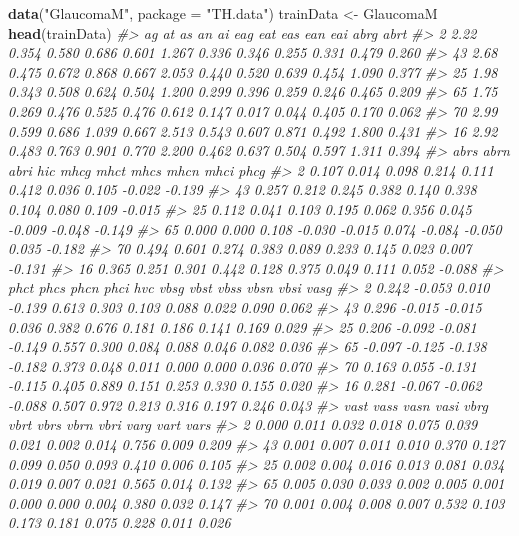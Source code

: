 \documentclass[]{book}
\newenvironment{Shaded}{\begin{snugshade}}{\end{snugshade}}
\newcommand{\CommentTok}[1]{\textcolor[rgb]{0.56,0.35,0.01}{\textit{#1}}}
\newcommand{\DataTypeTok}[1]{\textcolor[rgb]{0.13,0.29,0.53}{#1}}
\newcommand{\KeywordTok}[1]{\textcolor[rgb]{0.13,0.29,0.53}{\textbf{#1}}}
\newcommand{\NormalTok}[1]{#1}
\newcommand{\StringTok}[1]{\textcolor[rgb]{0.31,0.60,0.02}{#1}}
\begin{document}
\begin{Shaded}
\begin{Highlighting}[]
\KeywordTok{data}\NormalTok{(}\StringTok{"GlaucomaM"}\NormalTok{, }\DataTypeTok{package =} \StringTok{"TH.data"}\NormalTok{)}
\NormalTok{trainData <-}\StringTok{ }\NormalTok{GlaucomaM}
\KeywordTok{head}\NormalTok{(trainData)}
\CommentTok{#>      ag    at    as    an    ai   eag   eat   eas   ean   eai  abrg  abrt}
\CommentTok{#> 2  2.22 0.354 0.580 0.686 0.601 1.267 0.336 0.346 0.255 0.331 0.479 0.260}
\CommentTok{#> 43 2.68 0.475 0.672 0.868 0.667 2.053 0.440 0.520 0.639 0.454 1.090 0.377}
\CommentTok{#> 25 1.98 0.343 0.508 0.624 0.504 1.200 0.299 0.396 0.259 0.246 0.465 0.209}
\CommentTok{#> 65 1.75 0.269 0.476 0.525 0.476 0.612 0.147 0.017 0.044 0.405 0.170 0.062}
\CommentTok{#> 70 2.99 0.599 0.686 1.039 0.667 2.513 0.543 0.607 0.871 0.492 1.800 0.431}
\CommentTok{#> 16 2.92 0.483 0.763 0.901 0.770 2.200 0.462 0.637 0.504 0.597 1.311 0.394}
\CommentTok{#>     abrs  abrn  abri    hic   mhcg  mhct   mhcs   mhcn   mhci   phcg}
\CommentTok{#> 2  0.107 0.014 0.098  0.214  0.111 0.412  0.036  0.105 -0.022 -0.139}
\CommentTok{#> 43 0.257 0.212 0.245  0.382  0.140 0.338  0.104  0.080  0.109 -0.015}
\CommentTok{#> 25 0.112 0.041 0.103  0.195  0.062 0.356  0.045 -0.009 -0.048 -0.149}
\CommentTok{#> 65 0.000 0.000 0.108 -0.030 -0.015 0.074 -0.084 -0.050  0.035 -0.182}
\CommentTok{#> 70 0.494 0.601 0.274  0.383  0.089 0.233  0.145  0.023  0.007 -0.131}
\CommentTok{#> 16 0.365 0.251 0.301  0.442  0.128 0.375  0.049  0.111  0.052 -0.088}
\CommentTok{#>      phct   phcs   phcn   phci   hvc  vbsg  vbst  vbss  vbsn  vbsi  vasg}
\CommentTok{#> 2   0.242 -0.053  0.010 -0.139 0.613 0.303 0.103 0.088 0.022 0.090 0.062}
\CommentTok{#> 43  0.296 -0.015 -0.015  0.036 0.382 0.676 0.181 0.186 0.141 0.169 0.029}
\CommentTok{#> 25  0.206 -0.092 -0.081 -0.149 0.557 0.300 0.084 0.088 0.046 0.082 0.036}
\CommentTok{#> 65 -0.097 -0.125 -0.138 -0.182 0.373 0.048 0.011 0.000 0.000 0.036 0.070}
\CommentTok{#> 70  0.163  0.055 -0.131 -0.115 0.405 0.889 0.151 0.253 0.330 0.155 0.020}
\CommentTok{#> 16  0.281 -0.067 -0.062 -0.088 0.507 0.972 0.213 0.316 0.197 0.246 0.043}
\CommentTok{#>     vast  vass  vasn  vasi  vbrg  vbrt  vbrs  vbrn  vbri  varg  vart  vars}
\CommentTok{#> 2  0.000 0.011 0.032 0.018 0.075 0.039 0.021 0.002 0.014 0.756 0.009 0.209}
\CommentTok{#> 43 0.001 0.007 0.011 0.010 0.370 0.127 0.099 0.050 0.093 0.410 0.006 0.105}
\CommentTok{#> 25 0.002 0.004 0.016 0.013 0.081 0.034 0.019 0.007 0.021 0.565 0.014 0.132}
\CommentTok{#> 65 0.005 0.030 0.033 0.002 0.005 0.001 0.000 0.000 0.004 0.380 0.032 0.147}
\CommentTok{#> 70 0.001 0.004 0.008 0.007 0.532 0.103 0.173 0.181 0.075 0.228 0.011 0.026}

\end{Highlighting}
\end{Shaded}
\end{document}
